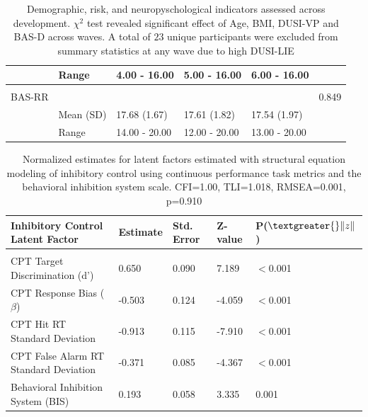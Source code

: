 \documentclass[utf8]{frontiersSCNS} %
\begin{document}
\begin{table}[h!]
\begin{tabular}{llllll}
                    & Range           & 4.00 - 16.00   & 5.00 - 16.00   & 6.00 - 16.00 &                          \\ \hline \\
BAS-RR         &                 &                  &                  &                  & 0.849                    \\
                    & Mean (SD)       & 17.68 (1.67)   & 17.61 (1.82)   & 17.54 (1.97)   &                          \\
                    & Range           & 14.00 - 20.00 & 12.00 - 20.00  & 13.00 - 20.00   &
\end{tabular}
\caption{Demographic, risk, and neuropyschological indicators assessed across development. $\chi^2$ test revealed significant effect of Age, BMI, DUSI-VP and BAS-D across waves. A total of $23$ unique participants were excluded from summary statistics at any wave due to high DUSI-LIE\label{tab:1}}
\end{table}
\begin{table}[h!]
\begin{tabular}{lllll}
Inhibitory Control Latent Factor                                               & Estimate & Std. Error & Z-value & P($\textgreater{}\|z\|$) \\ \hline \\
CPT Target Discrimination (d')         & 0.650 & 0.090      & 7.189  & $<$0.001                \\ 
CPT Response Bias ($\beta$)                  & -0.503   & 0.124      & -4.059  & $<$0.001         \\ 
CPT Hit RT Standard Deviation                           & -0.913    & 0.115      & -7.910   & $<$0.001 \\
CPT False Alarm RT Standard Deviation                       & -0.371   & 0.085      & -4.367  & $<$0.001 \\ 
Behavioral Inhibition System (BIS)                             & 0.193    & 0.058      & 3.335   & 0.001
\end{tabular}
\caption{Normalized estimates for latent factors estimated with structural equation modeling of inhibitory control using continuous performance task metrics and the behavioral inhibition system scale. CFI=1.00, TLI=1.018, RMSEA=0.001, p=0.910\label{tab:2}}
\end{table}
\end{document}
